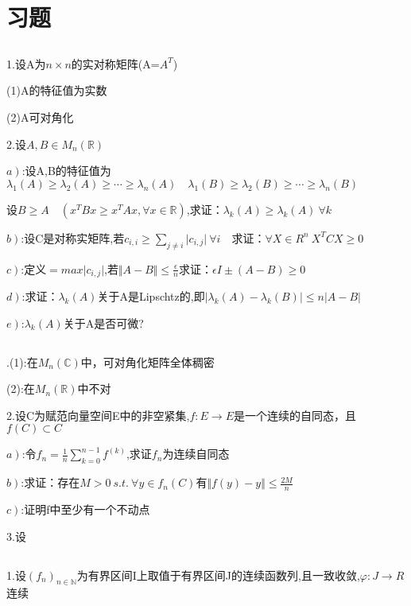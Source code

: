 \documentclass[hyperfer,UTF8,a4paper,12pt]{article}
\theoremstyle{plain}
\begin{document}
\section{习题}
\subsection{}\noindent
1.设A为$ n\times n $的实对称矩阵(A=$ A^T $)

(1)A的特征值为实数

(2)A可对角化

2.设$ A,B\in M_n(\mathbb{R}) $

$\left.a\right)$:设A,B的特征值为$ \lambda_1(A)\ge\lambda_2(A)\ge\cdots\ge\lambda_n(A)\quad\lambda_1(B)\ge\lambda_2(B)\ge\cdots\ge\lambda_n(B) $

设$ B\ge A\quad (x^TBx\ge x^TAx,\forall x\in \mathbb{R})$,求证：$ \lambda_k(A)\ge\lambda_k(A)\ \forall k $

$\left.b\right)$:设C是对称实矩阵,若$c_{i,i}\ge\sum\limits_{j\not=i}\vert c_{i,j}\vert \ \forall i\quad $求证：$\forall X\in R^n\  X^TCX\ge 0 $

$\left.c\right)$:定义$=max\vert c_{i,j}\vert$,若$ \Vert A-B\Vert\le \frac{\epsilon}{n} $求证：$ \epsilon I\pm (A-B)\ge 0 $

$\left.d\right)$:求证：$ \lambda_k(A) $关于A是Lipschtz的,即$\vert \lambda_k(A)-\lambda_k(B)\vert\le n\vert A-B \vert $

$\left.e\right)$:$ \lambda_k(A) $关于A是否可微?

\subsection{}.(1):在$ M_n(\mathbb{C}) $中，可对角化矩阵全体稠密

(2):在$ M_n(\mathbb{R}) $中不对

2.设C为赋范向量空间E中的非空紧集,$ f:E\to E $是一个连续的自同态，且$ f(C)\subset C $

$\left.a\right)$:令$ f_n=\frac{1}{n}\sum\limits_{k=0}^{n-1}f^{(k)} $,求证$ f_n $为连续自同态

$\left.b\right)$:求证：存在$ M>0\ s.t.\ \forall y\in f_n(C)  $有$ \Vert f(y)-y\Vert\le \frac{2M}{n} $

$\left.c\right)$:证明f中至少有一个不动点

3.设
\subsection{}\noindent
1.设$ (f_n)_{n\in\mathbb{N}}$为有界区间I上取值于有界区间J的连续函数列,且一致收敛,$ \varphi:J\to R $连续
\end{document}
